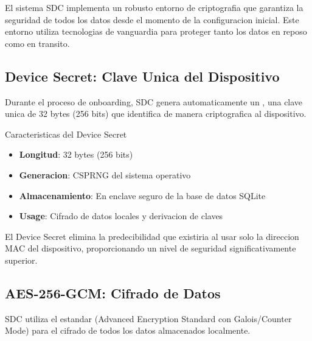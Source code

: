 El sistema SDC implementa un robusto entorno de criptografia que garantiza la seguridad de todos los datos desde el momento de la configuracion inicial. Este entorno utiliza tecnologias de vanguardia para proteger tanto los datos en reposo como en transito.


\subsection{Device Secret: Clave Unica del Dispositivo}

Durante el proceso de onboarding, SDC genera automaticamente un , una clave unica de 32 bytes (256 bits) que identifica de manera criptografica al dispositivo.


\begin{caja}{Caracteristicas del Device Secret}
\begin{itemize}
\item \textbf{Longitud}: 32 bytes (256 bits)
\item \textbf{Generacion}: CSPRNG del sistema operativo
\item \textbf{Almacenamiento}: En enclave seguro de la base de datos SQLite
\item \textbf{Usage}: Cifrado de datos locales y derivacion de claves
\end{itemize}
\end{caja}

El Device Secret elimina la predecibilidad que existiria al usar solo la direccion MAC del dispositivo, proporcionando un nivel de seguridad significativamente superior.

\subsection{AES-256-GCM: Cifrado de Datos}

SDC utiliza el estandar  (Advanced Encryption Standard con Galois/Counter Mode) para el cifrado de todos los datos almacenados localmente.


